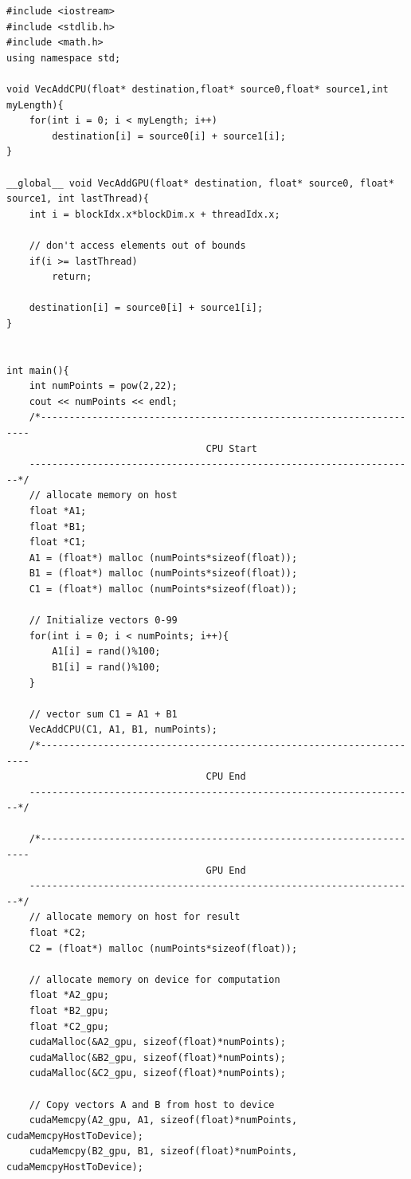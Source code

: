 \singlespacing
\clearpage
\begin{lstlisting}[caption={Comparison of CPU verse GPU code.},label={code:GPUvsCPU}]
#include <iostream>
#include <stdlib.h>
#include <math.h>
using namespace std;

void VecAddCPU(float* destination,float* source0,float* source1,int myLength){
	for(int i = 0; i < myLength; i++)
		destination[i] = source0[i] + source1[i];
}

__global__ void VecAddGPU(float* destination, float* source0, float* source1, int lastThread){
	int i = blockIdx.x*blockDim.x + threadIdx.x;

	// don't access elements out of bounds
	if(i >= lastThread)
		return;

	destination[i] = source0[i] + source1[i];
}


int main(){
	int numPoints = pow(2,22);
	cout << numPoints << endl;
	/*--------------------------------------------------------------------
                               	   CPU Start
	--------------------------------------------------------------------*/
	// allocate memory on host
	float *A1;
	float *B1;
	float *C1;
	A1 = (float*) malloc (numPoints*sizeof(float));
	B1 = (float*) malloc (numPoints*sizeof(float));
	C1 = (float*) malloc (numPoints*sizeof(float));

	// Initialize vectors 0-99
	for(int i = 0; i < numPoints; i++){
		A1[i] = rand()%100;
		B1[i] = rand()%100;
	}

	// vector sum C1 = A1 + B1
	VecAddCPU(C1, A1, B1, numPoints);
	/*--------------------------------------------------------------------
                               	   CPU End
	--------------------------------------------------------------------*/

	/*--------------------------------------------------------------------
                               	   GPU End
	--------------------------------------------------------------------*/
	// allocate memory on host for result
	float *C2;
	C2 = (float*) malloc (numPoints*sizeof(float));

	// allocate memory on device for computation
	float *A2_gpu;
	float *B2_gpu;
	float *C2_gpu;
	cudaMalloc(&A2_gpu, sizeof(float)*numPoints);
	cudaMalloc(&B2_gpu, sizeof(float)*numPoints);
	cudaMalloc(&C2_gpu, sizeof(float)*numPoints);

	// Copy vectors A and B from host to device
	cudaMemcpy(A2_gpu, A1, sizeof(float)*numPoints, cudaMemcpyHostToDevice);
	cudaMemcpy(B2_gpu, B1, sizeof(float)*numPoints, cudaMemcpyHostToDevice);


\end{lstlisting}

